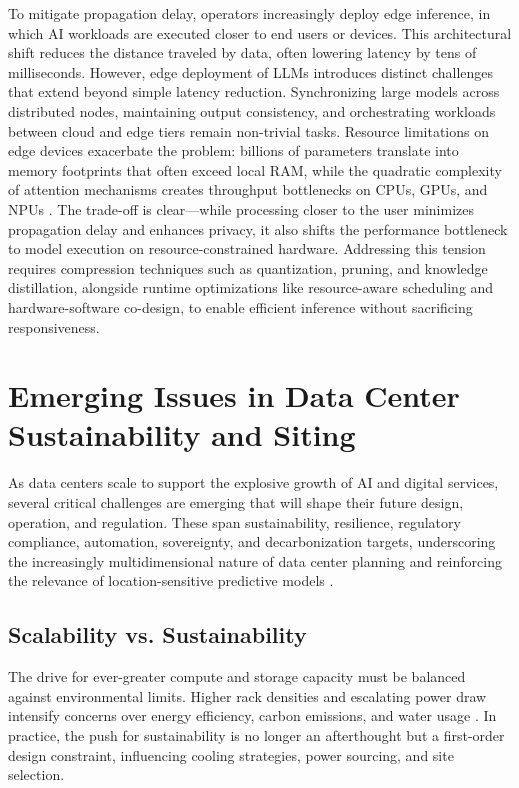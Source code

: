 \documentclass[conference]{IEEEtran}
\begin{document}
To mitigate propagation delay, operators increasingly deploy edge inference, in which AI workloads are executed closer to end users or devices. This architectural shift reduces the distance traveled by data, often lowering latency by tens of milliseconds. However, edge deployment of LLMs introduces distinct challenges that extend beyond simple latency reduction. Synchronizing large models across distributed nodes, maintaining output consistency, and orchestrating workloads between cloud and edge tiers remain non-trivial tasks. Resource limitations on edge devices exacerbate the problem: billions of parameters translate into memory footprints that often exceed local RAM, while the quadratic complexity of attention mechanisms creates throughput bottlenecks on CPUs, GPUs, and NPUs \cite{Zakarya2024}. The trade-off is clear---while processing closer to the user minimizes propagation delay and enhances privacy, it also shifts the performance bottleneck to model execution on resource-constrained hardware. Addressing this tension requires compression techniques such as quantization, pruning, and knowledge distillation, alongside runtime optimizations like resource-aware scheduling and hardware-software co-design, to enable efficient inference without sacrificing responsiveness.

\section{Emerging Issues in Data Center Sustainability and Siting}

As data centers scale to support the explosive growth of AI and digital services, several critical challenges are emerging that will shape their future design, operation, and regulation. These span sustainability, resilience, regulatory compliance, automation, sovereignty, and decarbonization targets, underscoring the increasingly multidimensional nature of data center planning and reinforcing the relevance of location-sensitive predictive models \cite{Zakarya2024}.

\subsection{Scalability vs. Sustainability}

The drive for ever-greater compute and storage capacity must be balanced against environmental limits. Higher rack densities and escalating power draw intensify concerns over energy efficiency, carbon emissions, and water usage \cite{Zakarya2024}. In practice, the push for sustainability is no longer an afterthought but a first-order design constraint, influencing cooling strategies, power sourcing, and site selection.
\end{document}
